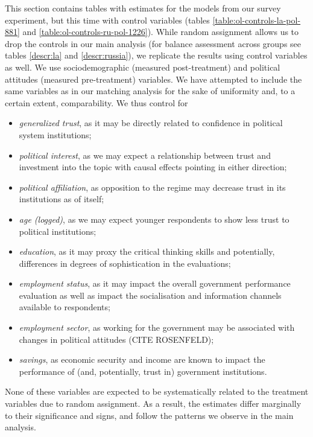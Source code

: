 \documentclass[11pt, ngerman,english,a4]{article}
\begin{document}
This section contains tables with estimates for the models from our survey experiment, but this time with control variables (tables \ref{table:ol-controls-la-pol-881} and \ref{table:ol-controls-ru-pol-1226}). While random assignment allows us to drop the controls in our main analysis (for balance assessment across groups see tables \ref{descr:la} and \ref{descr:russia}), we replicate the results using control variables as well. We use sociodemographic (measured post-treatment) and political attitudes (measured pre-treatment) variables. We have attempted to include the same variables as in our matching analysis for the sake of uniformity and, to a certain extent, comparability. We thus control for 
\begin{itemize}
\item \textit{generalized trust}, as it may be directly related to confidence in political system institutions; 
\item \textit{political interest}, as we may expect a relationship between trust and investment into the topic with causal effects pointing in either direction; 
\item \textit{political affiliation}, as opposition to the regime may decrease trust in its institutions as of itself; 
\item \textit{age (logged)}, as we may expect younger respondents to show less trust to political institutions;
\item \textit{education}, as it may proxy the critical thinking skills and potentially, differences in degrees of sophistication in the evaluations; 
\item \textit{employment status}, as it may impact the overall government performance evaluation as well as impact the socialisation and information channels available to respondents; 
\item \textit{employment sector}, as working for the government may be associated with changes in political attitudes (CITE ROSENFELD);
\item \textit{savings}, as economic security and income are known to impact the performance of (and, potentially, trust in) government institutions.
\end{itemize}
None of these variables are expected to be systematically related to the treatment variables due to random assignment. As a result, the estimates differ marginally to their significance and signs, and follow the patterns we observe in the main analysis.


\clearpage

\end{document}
